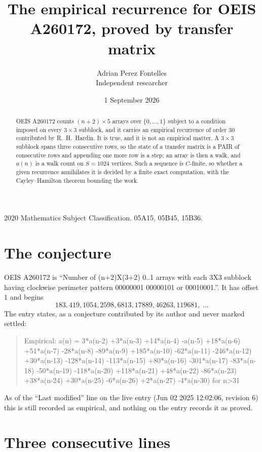 \documentclass[11pt,a4paper]{article}
\title{The empirical recurrence for OEIS A260172, proved by transfer matrix}
\author{Adrian Perez Fontelles\\ \small Independent researcher}
\date{1 September 2026}
\theoremstyle{plain}
\theoremstyle{definition}
\begin{document}
\maketitle

\begin{abstract}
OEIS A260172 counts $(n+2)\times5$ arrays over $\{0,\dots,1\}$ subject to a condition imposed on
every $3\times3$ subblock, and it carries an empirical recurrence of order $30$
contributed by R.~H.~Hardin. It is true, and it is not an empirical matter. A $3\times3$
subblock spans three consecutive rows, so the state of a transfer matrix is a PAIR of
consecutive rows and appending one more row is a step; an array is then a walk, and
$a(n)$ is a walk count on $S=1024$ vertices. Such a sequence is $C$-finite, so whether a given
recurrence annihilates it is decided by a finite exact computation, with the Cayley--Hamilton
theorem bounding the work.
\end{abstract}

\noindent\small 2020 Mathematics Subject Classification. 05A15, 05B45, 15B36.\normalsize

\section{The conjecture}

OEIS A260172 is ``Number of (n+2)X(3+2) 0..1 arrays with each 3X3 subblock having clockwise perimeter pattern 00000001 00000101 or 00010001.''. It has offset $1$ and begins
\[
183, 419, 1054, 2598, 6813, 17889, 46263, 119681,\ \dots
\]
The entry states, as a conjecture contributed by its author and never marked settled:
\begin{quote}
Empirical: a(n) = 3*a(n-2) +3*a(n-3) +14*a(n-4) -a(n-5) +18*a(n-6) +51*a(n-7) -28*a(n-8) -89*a(n-9) +185*a(n-10) -62*a(n-11) -246*a(n-12) +30*a(n-13) -128*a(n-14) -113*a(n-15) +80*a(n-16) -301*a(n-17) -83*a(n-18) -50*a(n-19) -118*a(n-20) +118*a(n-21) +48*a(n-22) -86*a(n-23) +38*a(n-24) +30*a(n-25) -6*a(n-26) +2*a(n-27) -4*a(n-30) for n>31
\end{quote}
As of the ``Last modified'' line on the live entry (Jun 02 2025 12:02:06, revision 6) this is still
recorded as empirical, and nothing on the entry records it as proved.

\section{Three consecutive lines}
\end{document}
